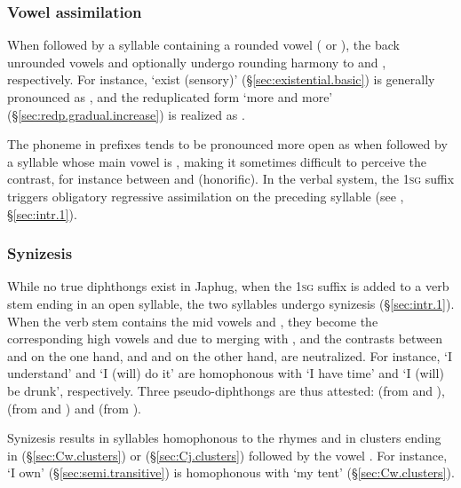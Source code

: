 \subsubsection{Vowel assimilation} \label{sec:vowel.harmony}
When followed by a syllable containing a rounded vowel ( or ), the back unrounded vowels  and  optionally undergo rounding harmony to  and , respectively. For instance,  `exist (sensory)' (§\ref{sec:existential.basic}) is generally pronounced as  , and the reduplicated form  `more and more' (§\ref{sec:redp.gradual.increase}) is realized as .

The phoneme  in prefixes tends to be pronounced more open as  when followed by a syllable whose main vowel is , making it sometimes difficult to perceive the contrast, for instance between  and  (honorific). In the verbal system, the \textsc{1sg}  suffix triggers obligatory regressive assimilation  \fl{}  on the preceding syllable (see , §\ref{sec:intr.1}).

\subsubsection{Synizesis} \label{sec:synizesis}
While no true diphthongs exist in Japhug, when the \textsc{1sg}  suffix is added to a verb stem ending in an open syllable, the two syllables undergo synizesis (§\ref{sec:intr.1}). When the verb stem contains the mid vowels  and , they become the corresponding high vowels  and  due to merging with , and the contrasts between  and  on the one hand, and  and  on the other hand, are neutralized. For instance,   `I understand' and   `I (will) do it' are homophonous with  `I have time' and  `I (will) be drunk', respectively. Three pseudo-diphthongs are thus attested:  (from  and ),  (from  and ) and  (from ).

Synizesis results in syllables homophonous to the rhymes  and  in clusters ending in  (§\ref{sec:Cw.clusters}) or  (§\ref{sec:Cj.clusters}) followed by the vowel . For instance,  `I own' (§\ref{sec:semi.transitive}) is homophonous with  `my tent' (§\ref{sec:Cw.clusters}). 

